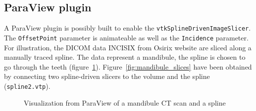 \documentclass{InsightArticle}
\begin{document}
\subsection{ParaView plugin}
%
A ParaView plugin is possibly built to enable the 
\verb!vtkSplineDrivenImageSlicer!. The \verb!OffsetPoint! parameter is
animateable as well as the \verb!Incidence! parameter. For illustration, the
DICOM data INCISIX from Osirix website \cite{OSIRIX,INCISIX} are sliced along
a manually traced spline. The data represent a mandibule, the spline is chosen
to go through the teeth (figure~\ref{fig:mandibule_spline}). 
Figure~\ref{fig:mandibule_slices} have been obtained by connecting two 
spline-driven slicers to the volume and the spline (\verb!spline2.vtp!).
%
\begin{figure}
\centering
{}
\caption{Visualization from ParaView of a mandibule CT scan and a spline}
\label{fig:mandibule_spline}
\end{figure}
%
\end{document}
